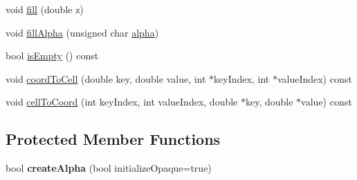 \begin{DoxyCompactItemize}
void \hyperlink{classQCPColorMapData_a350f783260eb9b5de5c7b5e0d5d3e3c2}{fill} (double z)
\item 
void \hyperlink{classQCPColorMapData_a93e2a549d7702bc849cd48a585294657}{fill\+Alpha} (unsigned char \hyperlink{classQCPColorMapData_a4f7e6b7a97017400cbbd46f0660e68ea}{alpha})
\item 
bool \hyperlink{classQCPColorMapData_a986009324aee1fc5f696db46bd03dde5}{is\+Empty} () const 
\item 
void \hyperlink{classQCPColorMapData_a26e33c5ec7094b60136350bcd77d3737}{coord\+To\+Cell} (double key, double value, int $\ast$key\+Index, int $\ast$value\+Index) const 
\item 
void \hyperlink{classQCPColorMapData_ac96d6e84befe7b9951b5da6d4d4a2a47}{cell\+To\+Coord} (int key\+Index, int value\+Index, double $\ast$key, double $\ast$value) const 
\end{DoxyCompactItemize}
\subsection*{Protected Member Functions}
\begin{DoxyCompactItemize}
\item 
bool {\bfseries create\+Alpha} (bool initialize\+Opaque=true)\hypertarget{classQCPColorMapData_a42c2b1c303683515fa4de4c551f54441}{}\label{classQCPColorMapData_a42c2b1c303683515fa4de4c551f54441}

\end{DoxyCompactItemize}
